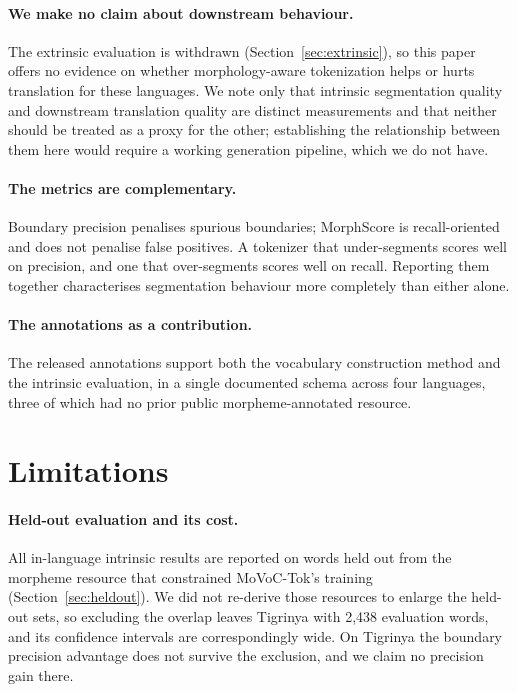\documentclass[11pt]{article}
\begin{document}
\paragraph{We make no claim about downstream behaviour.}
The extrinsic evaluation is withdrawn (Section~\ref{sec:extrinsic}), so this
paper offers no evidence on whether morphology-aware tokenization helps or
hurts translation for these languages. We note only that intrinsic segmentation
quality and downstream translation quality are distinct measurements and that
neither should be treated as a proxy for the other; establishing the
relationship between them here would require a working generation pipeline,
which we do not have.

\paragraph{The metrics are complementary.}
Boundary precision penalises spurious boundaries; MorphScore is recall-oriented
and does not penalise false positives. A tokenizer that under-segments scores
well on precision, and one that over-segments scores well on recall. Reporting
them together characterises segmentation behaviour more completely than either
alone.

\paragraph{The annotations as a contribution.}
The released annotations support both the vocabulary construction method and
the intrinsic evaluation, in a single documented schema across four languages,
three of which had no prior public morpheme-annotated resource.

\section{Limitations}
\label{sec:limitations}

\paragraph{Held-out evaluation and its cost.}
All in-language intrinsic results are reported on words held out from the
morpheme resource that constrained MoVoC-Tok's training
(Section~\ref{sec:heldout}). We did not re-derive those resources to enlarge
the held-out sets, so excluding the overlap leaves Tigrinya with 2,438
evaluation words, and its confidence intervals are correspondingly wide. On
Tigrinya the boundary precision advantage does not survive the exclusion, and
we claim no precision gain there.
\end{document}
